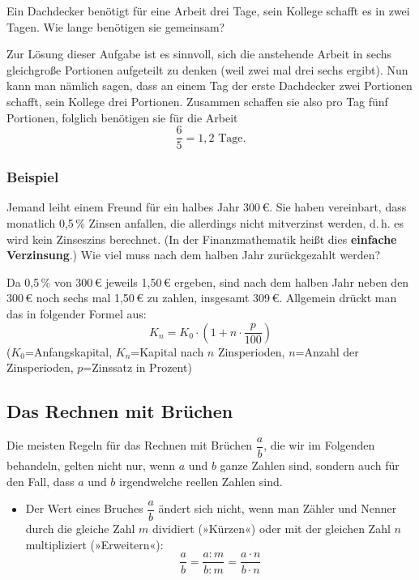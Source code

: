 Ein Dachdecker benötigt für eine Arbeit drei Tage, sein Kollege schafft es in zwei Tagen. Wie lange benötigen sie gemeinsam?

Zur Lösung dieser Aufgabe ist es sinnvoll, sich die anstehende Arbeit in sechs gleichgroße Portionen aufgeteilt zu denken (weil zwei mal drei sechs ergibt). Nun kann man nämlich sagen, dass an einem Tag der erste Dachdecker zwei Portionen schafft, sein Kollege drei Portionen. Zusammen schaffen sie also pro Tag fünf Portionen, folglich benötigen sie für die Arbeit
\[ \frac{6}{5} = 1{,}2 \text{ Tage.}\]\beispielende

\subsubsection{Beispiel}

Jemand leiht einem Freund für ein halbes Jahr 300\,€. Sie haben vereinbart, dass monatlich 0{,}5\,\% Zinsen anfallen, die allerdings nicht mitverzinst werden, d.\,h. es wird kein Zinseszins berechnet. (In der Finanzmathematik heißt dies \textbf{einfache Verzinsung}.) Wie viel muss nach dem halben Jahr zurückgezahlt werden?

Da 0{,}5\,\% von 300\,€ jeweils 1{,}50\,€ ergeben, sind nach dem halben Jahr neben den 300\,€ noch sechs mal 1{,}50\,€ zu zahlen, insgesamt 309\,€. Allgemein drückt man das in folgender Formel aus:
\[ K_n = K_0 \cdot \left(1 + n \cdot \frac{p}{100}\right) \]
($K_0$=Anfangskapital, $K_n$=Kapital nach $n$ Zinsperioden, $n$=Anzahl der Zinsperioden, $p$=Zinssatz in Prozent)\beispielende

\subsection{Das Rechnen mit Brüchen}

Die meisten Regeln für das Rechnen mit Brüchen $\dfrac{a}{b}$, die wir im Folgenden behandeln, gelten nicht nur, wenn $a$ und $b$ ganze Zahlen sind, sondern auch für den Fall, dass $a$ und $b$ irgendwelche reellen Zahlen sind.

\begin{itemize}
  \item Der Wert eines Bruches $\dfrac{a}{b}$ ändert sich nicht, wenn man Zähler und Nenner durch die gleiche Zahl $m$ dividiert (»Kürzen«) oder mit der gleichen Zahl $n$ multipliziert (»Erweitern«):
  \[ \frac{a}{b} = \frac{a : m}{b : m} = \frac{a \cdot n}{b \cdot n} \]
\end{itemize}

